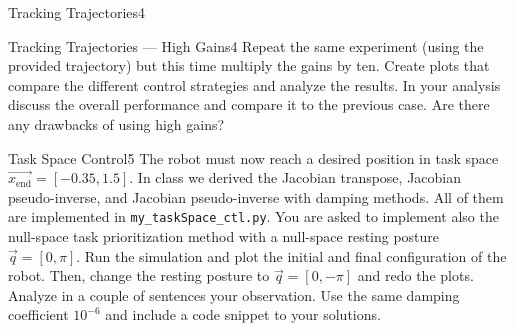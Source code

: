 \begin{questions}
\begin{question}{Tracking Trajectories}{4}
	\end{question}
	
	
	\begin{question}{Tracking Trajectories --- High Gains}{4}
		Repeat the same experiment (using the provided trajectory) but this time multiply the gains by ten. Create plots that compare the different control strategies and analyze the results. In your analysis discuss the overall performance and compare it to the previous case. Are there any drawbacks of using high gains?
		
\begin{answer}
\end{answer}
		
	\end{question}
	
	
	\begin{question}[bonus]{Task Space Control}{5}
		The robot must now reach a desired position in task space $\vec{x_\textrm{end}}={[-0.35,1.5]}$. In class we derived the Jacobian transpose, Jacobian pseudo-inverse, and Jacobian pseudo-inverse with damping methods. All of them are implemented in \texttt{my\_taskSpace\_ctl.py}. You are asked to implement also the null-space task prioritization method with a null-space resting posture $\vec q=[0,\pi]$. Run the simulation and plot the initial and final configuration of the robot. Then, change the resting posture to $\vec q=[0,-\pi]$ and redo the plots. Analyze in a couple of sentences your observation. Use the same damping coefficient $10^{-6}$ and include a code snippet to your solutions.
		
\begin{answer}
\end{answer}
		
	\end{question}
	
\end{questions}

